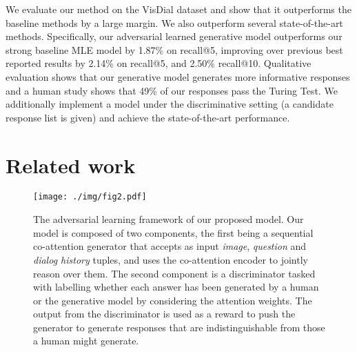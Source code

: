 \documentclass[10pt,twocolumn,letterpaper]{article}
\begin{document}
We evaluate our method on the VisDial dataset \cite{das2016visual} and show that it outperforms the baseline methods by a large margin. We also outperform several state-of-the-art methods. Specifically, our adversarial learned generative model outperforms our strong baseline MLE model by 1.87\% on recall@5, improving over previous best reported results by 2.14\% on recall@5, and 2.50\% recall@10. Qualitative evaluation shows that our generative model generates more informative responses and a human study shows that 49\% of our responses pass the Turing Test. We additionally implement a model under the discriminative setting (a candidate response list is given) and achieve the state-of-the-art performance.

 \section{Related work}

\begin{figure*}[t]
\begin{center}
\texttt{[image: ./img/fig2.pdf]}
\end{center}
\vspace{-10pt}
   \caption{The adversarial learning framework of our proposed model. Our model is composed of two components, the first being a sequential co-attention generator that accepts as input \textit{image}, \textit{question} and \textit{dialog history} tuples, and uses the co-attention encoder to jointly reason over them. The second component is a discriminator tasked with labelling whether each answer has been generated by a human or the generative model by considering the attention weights. The output from the discriminator is used as a reward to push the generator to generate responses that are indistinguishable from those a human might generate.}
\vspace{-7pt}
\label{frame}
\end{figure*}
\end{document}
